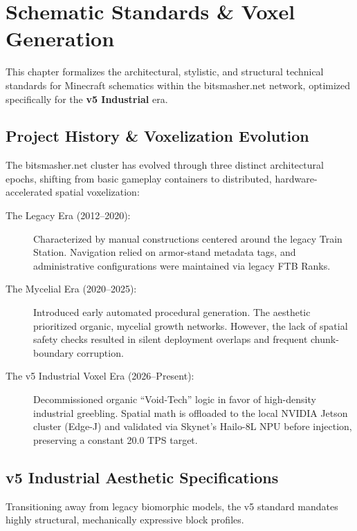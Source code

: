 \chapter{Schematic Standards \& Voxel Generation}

This chapter formalizes the architectural, stylistic, and structural technical standards for Minecraft schematics within the bitsmasher.net network, optimized specifically for the \textbf{v5 Industrial} era. 

\section{Project History \& Voxelization Evolution}
The bitsmasher.net cluster has evolved through three distinct architectural epochs, shifting from basic gameplay containers to distributed, hardware-accelerated spatial voxelization:

\begin{description}
    \item[The Legacy Era (2012--2020):] Characterized by manual constructions centered around the legacy Train Station. Navigation relied on armor-stand metadata tags, and administrative configurations were maintained via legacy FTB Ranks. 
    \item[The Mycelial Era (2020--2025):] Introduced early automated procedural generation. The aesthetic prioritized organic, mycelial growth networks. However, the lack of spatial safety checks resulted in silent deployment overlaps and frequent chunk-boundary corruption.
    \item[The v5 Industrial Voxel Era (2026--Present):] Decommissioned organic ``Void-Tech'' logic in favor of high-density industrial greebling. Spatial math is offloaded to the local NVIDIA Jetson cluster (Edge-J) and validated via Skynet's Hailo-8L NPU before injection, preserving a constant 20.0 TPS target.
\end{description}

\section{v5 Industrial Aesthetic Specifications}
Transitioning away from legacy biomorphic models, the v5 standard mandates highly structural, mechanically expressive block profiles.


